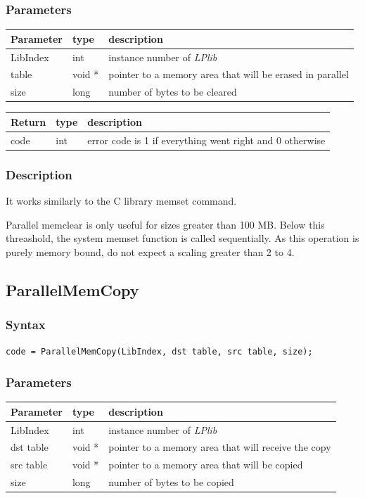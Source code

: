 \documentclass[a4paper,12pt]{article}
\begin{document}
\subsubsection*{Parameters}
\begin{tabular}{|m{2cm}|m{1.5cm}|m{10.5cm}|}
\hline
Parameter  & type   & description \\
\hline
LibIndex   & int    & instance number of \emph{LPlib} \\
\hline
table      & void * & pointer to a memory area that will be erased in parallel \\
\hline
size       & long   & number of bytes to be cleared \\
\hline
\end{tabular}

\medskip

\noindent
\begin{tabular}{|m{2cm}|m{1.5cm}|m{10.5cm}|}
\hline
Return     & type   & description \\
\hline
code       & int    & error code is 1 if everything went right and 0 otherwise \\
\hline
\end{tabular}

\subsubsection*{Description}
It works similarly to the C library memset command.

Parallel memclear is only useful for sizes greater than 100 MB. Below this threashold, the system memset function is called sequentially. As this operation is purely memory bound, do not expect a scaling greater than 2 to 4.


\subsection{ParallelMemCopy}

\subsubsection*{Syntax}
\tt{code = ParallelMemCopy(LibIndex, dst table, src table, size);}
\normalfont

\subsubsection*{Parameters}
\begin{tabular}{|m{2cm}|m{1.5cm}|m{10.5cm}|}
\hline
Parameter  & type   & description \\
\hline
LibIndex   & int    & instance number of \emph{LPlib} \\
\hline
dst table  & void * & pointer to a memory area that will receive the copy \\
\hline
src table  & void * & pointer to a memory area that will be copied \\
\hline
size       & long   & number of bytes to be copied \\
\hline
\end{tabular}
\end{document}
